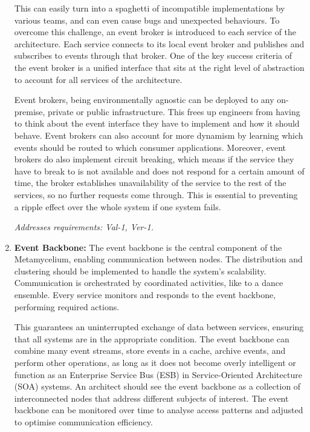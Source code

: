 \documentclass[preprint,12pt]{elsarticle}
\begin{document}
\begin{enumerate}
    This can easily turn into a spaghetti of incompatible implementations by various teams, and can even cause bugs and unexpected behaviours. To overcome this challenge, an event broker is introduced to each service of the architecture. Each service connects to its local event broker and publishes and subscribes to events through that broker. One of the key success criteria of the event broker is a unified interface that sits at the right level of abstraction to account for all services of the architecture. 
    
    Event brokers, being environmentally agnostic can be deployed to any on-premise, private or public infrastructure. This frees up engineers from having to think about the event interface they have to implement and how it should behave. Event brokers can also account for more dynamism by learning which events should be routed to which consumer applications. Moreover, event brokers do also implement circuit breaking, which means if the service they have to break to is not available and does not respond for a certain amount of time, the broker establishes unavailability of the service to the rest of the services, so no further requests come through. This is essential to preventing a ripple effect over the whole system if one system fails. 
    
    \textit{Addresses requirements: Val-1, Ver-1.} 

    \item \textbf{Event Backbone:} The event backbone is the central component of the Metamycelium, enabling communication between nodes. The distribution and clustering should be implemented to handle the system's scalability. Communication is orchestrated by coordinated activities, like to a dance ensemble. Every service monitors and responds to the event backbone, performing required actions. 
    
    This guarantees an uninterrupted exchange of data between services, ensuring that all systems are in the appropriate condition. The event backbone can combine many event streams, store events in a cache, archive events, and perform other operations, as long as it does not become overly intelligent or function as an Enterprise Service Bus (ESB) in Service-Oriented Architecture (SOA) systems. An architect should see the event backbone as a collection of interconnected nodes that address different subjects of interest. The event backbone can be monitored over time to analyse access patterns and adjusted to optimise communication efficiency.


\end{enumerate}
\end{document}
